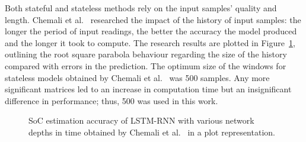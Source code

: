 %
 {} {
    Both stateful and stateless methods rely on the input samples' quality and length.
    Chemali et al.~\cite{Chemali2017} researched the impact of the history of input samples: the longer the period of input readings, the better the accuracy the model produced and the longer it took to compute.
    The research results are plotted in \mbox{Figure~\ref{fig:chemali-accuracy}}, outlining the root square parabola behaviour regarding the size of the history compared with errors in the prediction.
    The optimum size of the windows for stateless models obtained by Chemali et al.~\cite{Chemali2017} was 500 samples.
    Any more significant matrices led to an increase in computation time but an insignificant difference in performance; thus, 500 was used in this work.
}
\begin{figure}[H]
    
    \caption{SoC estimation accuracy of LSTM-RNN with various network depths in time obtained by Chemali et al.~\cite{Chemali2017} in a plot representation.}
    \label{fig:chemali-accuracy}
\end{figure}

